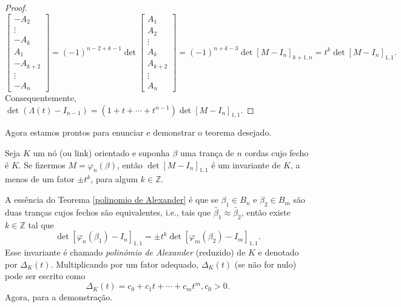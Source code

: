 \begin{proof}
\begin{equation*}
\begin{bmatrix}
    		-A_2 \\
    		\vdots\\
    		-A_k\\
    		A_1\\
    		-A_{k+2}\\
    		\vdots\\
    		-A_n
    		\end{bmatrix} = (-1)^{n-2+k-1}\det\begin{bmatrix}
    		A_1\\
    		A_2\\
    		\vdots\\
    		A_k\\
    		A_{k+2}\\
    		\vdots\\
    		A_n
    		\end{bmatrix} = (-1)^{n+k-3}\det[M - I_n]_{k+1, n} = t^k\det[M - I_n]_{1,1}.
		\end{equation*}
		Consequentemente, $\det(\Lambda(t) - I_{n-1}) = (1+t+\cdots+t^{n-1})\det[M - I_n]_{1,1}$.	
	\end{proof}
	Agora estamos prontos para enunciar e demonstrar o teorema desejado.
	\begin{theorem}
	\label{polinomio de Alexander}
		Seja $K$ um nó (ou link) orientado e suponha $\beta$ uma trança de $n$ cordas cujo fecho é $K$. 
		Se fizermos $M = \varphi_n(\beta)$, então $\det[M - I_n]_{1,1}$ é um invariante de $K$, 
		a menos de um fator $\pm t^k$, para algum $k\in\mathbb{Z}$.
	\end{theorem}
	A essência do Teorema \ref{polinomio de Alexander} é que se $\beta_1\in B_n$ e $\beta_2\in B_m$ 
	são duas tranças cujos fechos são equivalentes, i.e., tais que
	$\widetilde{\beta_1}\approx\widetilde{\beta_2}$, então existe $k\in\mathbb{Z}$ tal que
	\begin{equation*}
	    \det[\varphi_n(\beta_1) - I_n]_{1,1}=\pm t^k\det[\varphi_m(\beta_2) - I_m]_{1,1}.
	\end{equation*}
	Esse invariante é chamado \textit{polinômio de Alexander} (reduzido) de $K$ e denotado por $\Delta_K(t)$.
	Multiplicando por um fator adequado, $\Delta_K(t)$ (se não for nulo) pode ser escrito como
	\begin{equation*}
	    \Delta_K(t) = c_0 + c_1t + \cdots + c_mt^m, c_0>0.
	\end{equation*}
	Agora, para a demonstração.
